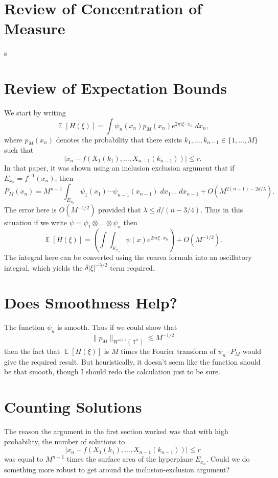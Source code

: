 \documentclass[dvipsnames,letterpaper,12pt]{article}
\numberwithin{equation}{section}
\DeclareMathOperator{\TT}{\mathbb{T}}
\numberwithin{theorem}{section}
\DeclareMathOperator{\EE}{\mathbb{E}}
\begin{document}
\section{Review of Concentration of Measure}

s

\section{Review of Expectation Bounds}

We start by writing
%
\[ \EE[H(\xi)] = \int \psi_n(x_n) p_M(x_n) e^{2 \pi i \xi \cdot x_n}\; dx_n, \]
%
where $p_M(x_n)$ denotes the probability that there exists $k_1,\dots,k_{n-1} \in \{ 1, \dots, M \}$ such that
%
\[ |x_n - f(X_1(k_1),\dots, X_{n-1}(k_{n-1}))| \leq r. \]
%
In that paper, it was shown using an inclusion exclusion argument that if $E_{x_n} = f^{-1}(x_n)$, then
%
\[ P_M(x_n) = M^{n-1} \int_{E_{x_n}} \psi_1(x_1) \cdots \psi_{n-1}(x_{n-1})\; dx_1 \dots\; dx_{n-1} + O(M^{2(n-1) - 2d/\lambda}). \]
%
The error here is $O(M^{-1/2})$ provided that $\lambda \leq d / (n - 3/4)$. Thus in this situation if we write $\psi = \psi_1 \otimes \dots \otimes \psi_n$ then
%
\[ \EE[H(\xi)] = \left( \int \int_{E_{x_n}} \psi(x) e^{2 \pi i \xi \cdot x_n} \right) + O(M^{-1/2}). \]
%
The integral here can be converted using the coarea formula into an oscillatory integral, which yields the $\delta |\xi|^{-\lambda/2}$ term required.

\section{Does Smoothness Help?}

The function $\psi_n$ is smooth. Thus if we could show that
%
\[ \| p_M \|_{W^{s/2,1}(\TT^d)} \lesssim M^{-1/2} \]
%
then the fact that $\EE[H(\xi)]$ is $M$ times the  Fourier transform of $\psi_n \cdot P_M$ would give the required result. But heuristically, it doesn't seem like the function should be that smooth, though I should redo the calculation just to be sure.



\section{Counting Solutions}

The reason the argument in the first section worked was that with high probability, the number of solutions to
%
\[ |x_n - f(X_1(k_1), \dots, X_{n-1}(k_{n-1}))| \leq r \]
%
was equal to $M^{n-1}$ times the surface area of the hyperplane $E_{x_n}$. Could we do something more robust to get around the inclusion-exclusion argument?
\end{document}
